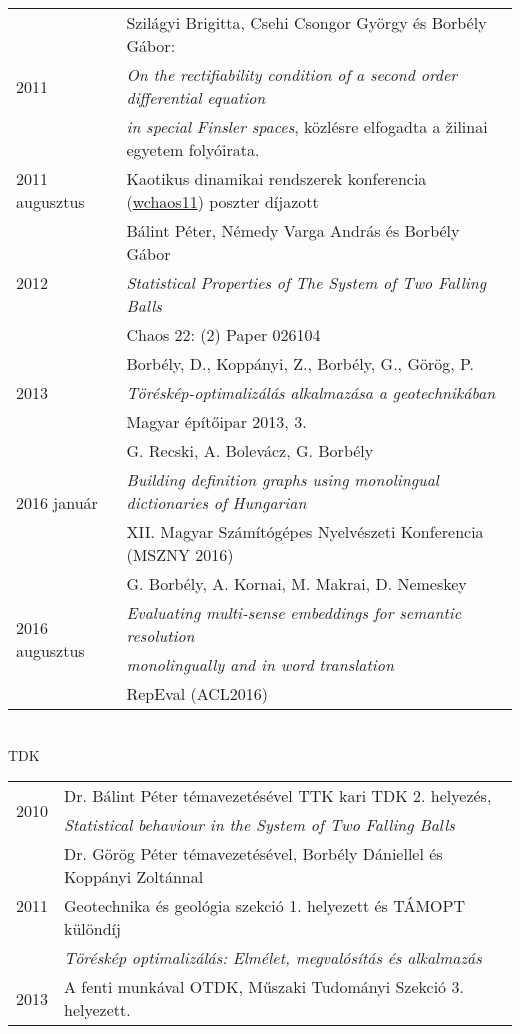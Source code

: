 \documentclass[12pt]{article}
\begin{document}
        \begin{tabular}{p{3.5cm}l}
		   \multirow{3}{*}[15pt]{2011}& Szilágyi Brigitta, Csehi Csongor György és Borbély Gábor:\\ & \emph{On the rectifiability condition of a second order differential equation}\\
						& \emph{in special Finsler spaces}, közlésre elfogadta a \v{z}ilinai egyetem folyóirata.\\
	       2011 augusztus & Kaotikus dinamikai rendszerek konferencia (\href{http://www.mpipks-dresden.mpg.de/~wchaos11/}{wchaos11}) poszter díjazott %
		   \\
			\multirow{3}{*}[15pt]{2012} & Bálint Péter, Némedy Varga András és Borbély Gábor\\ & \emph{Statistical Properties of The System of Two Falling Balls} \\
			& Chaos 22: (2) Paper 026104
			\\
			\multirow{3}{*}[15pt]{2013} & Borbély, D., Koppányi, Z., Borbély, G., Görög, P.\\ & \emph{Töréskép-optimalizálás alkalmazása a geotechnikában} \\
			& Magyar építőipar 2013, 3.
            \\
            \multirow{3}{*}[15pt]{2016 január} & G. Recski, A. Bolevácz, G. Borbély \\
            & \emph{Building definition graphs using monolingual dictionaries of Hungarian} \\
            & XII. Magyar Számítógépes Nyelvészeti Konferencia (MSZNY 2016)
            \\
            \multirow{4}{*}[15pt]{2016 augusztus} & G. Borbély, A. Kornai, M. Makrai, D. Nemeskey \\
            & \emph{Evaluating multi-sense embeddings for semantic resolution} \\
            & \emph{monolingually and in word translation} \\
            & RepEval (ACL2016)
       \end{tabular}
 \newpage
 { \ }\\ 
  \textsc{TDK}
 \vspace{0.3cm}
 \\
        \begin{tabular}{p{3.5cm}l}
		\multirow{2}{*}[8pt]{2010}& Dr. Bálint Péter témavezetésével TTK kari TDK 2. helyezés, \\ & \emph{Statistical behaviour in the
System of Two Falling Balls}\\
		\multirow{3}{*}[15pt]{2011}& Dr. Görög Péter témavezetésével, Borbély Dániellel és Koppányi Zoltánnal\\
								& Geotechnika és geológia szekció 1. helyezett és TÁMOPT különdíj\\
								& \emph{Töréskép optimalizálás: Elmélet, megvalósítás és alkalmazás}\\
		2013             & A fenti munkával OTDK, Műszaki Tudományi Szekció 3. helyezett.
       \end{tabular}
\end{document}
